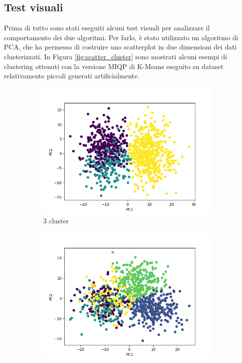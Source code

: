 \documentclass{article}
\begin{document}
    \subsection{Test visuali}
    Prima di tutto sono stati eseguiti alcuni test visuali per analizzare il comportamento dei due algoritmi. Per farlo, è stato utilizzato un algoritmo di PCA, che ha permesso di costruire uno scatterplot in due dimensioni dei dati clusterizzati. In Figura \ref{fig:scatter_cluster} sono mostrati alcuni esempi di clustering ottenuti con la versione MIQP di K-Means eseguito su dataset relativamente piccoli generati artificialmente.
    \begin{figure}[h]
     \centering
     \begin{subfigure}[b]{0.32\linewidth}
         \centering
         \includegraphics[width=\linewidth]{../results/plots/scatter_k3}
         \caption{3 cluster}
     \end{subfigure}
     \hfill
     \begin{subfigure}[b]{0.32\linewidth}
         \centering
         \includegraphics[width=\linewidth]{../results/plots/scatter_k5}

\end{subfigure}
\end{figure}
\end{document}
